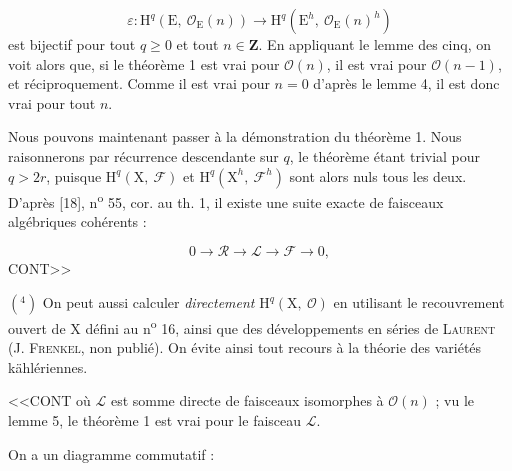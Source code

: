 \begin{equation*}
\varepsilon : \mathrm{H}^{q}(\mathrm{E},\ \mathcal{O}_{\mathrm{E}}(n)) \rightarrow \mathrm{H}^{q}(\mathrm{E}^{h},\ \mathcal{O}_{\mathrm{E}}(n)^{h})
\end{equation*}
est bijectif pour tout $q \geqslant 0$ et tout $n \in \mathbf{Z}$. En appliquant le lemme des cinq, on voit alors que, si le théorème 1 est vrai pour $\mathcal{O}(n)$, il est vrai pour $\mathcal{O}(n-1)$, et réciproquement. Comme il est vrai pour $n = 0$ d'après le lemme 4, il est donc vrai pour tout $n$.

Nous pouvons maintenant passer à la démonstration du théorème 1. Nous raisonnerons par récurrence descendante sur $q$, le théorème étant trivial pour $q > 2r$, puisque $\mathrm{H}^{q}(\mathrm{X},\ \mathcal{F})$ et $\mathrm{H}^{q}(\mathrm{X}^{h},\ \mathcal{F}^{h})$ sont alors nuls tous les deux. D'après [18], n\textsuperscript{o} 55, cor. au th. 1, il existe une suite exacte de faisceaux algébriques cohérents :

\begin{equation*}
0 \rightarrow \mathcal{R} \rightarrow \mathcal{L} \rightarrow \mathcal{F} \rightarrow 0,
\end{equation*}
CONT>>

$(^4)$ On peut aussi calculer \textit{directement} $\mathrm{H}^{q}(\mathrm{X},\ \mathcal{O})$ en utilisant le recouvrement ouvert de $\mathrm{X}$ défini au n\textsuperscript{o} 16, ainsi que des développements en séries de \textsc{Laurent} (J. \textsc{Frenkel}, non publié). On évite ainsi tout recours à la théorie des variétés kählériennes.



<<CONT où $\mathcal{L}$ est somme directe de faisceaux isomorphes à $\mathcal{O}(n)$ ; vu le lemme 5, le théorème 1 est vrai pour le faisceau $\mathcal{L}$.

On a un diagramme commutatif :

